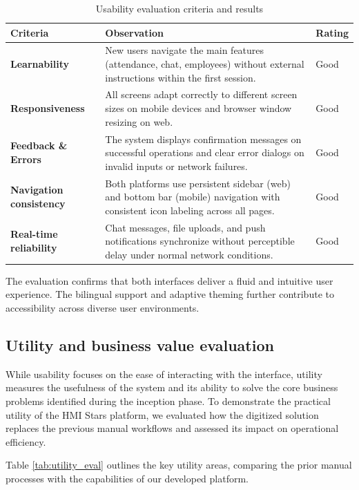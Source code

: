 \begin{table}[H]
\centering
\caption{Usability evaluation criteria and results}
\label{tab:usability_eval}
\begin{tabular}{|l|p{9cm}|l|}
\hline
\textbf{Criteria} & \textbf{Observation} & \textbf{Rating} \\
\hline
\textbf{Learnability} & New users navigate the main features (attendance, chat, employees) without external instructions within the first session. & Good \\
\hline
\textbf{Responsiveness} & All screens adapt correctly to different screen sizes on mobile devices and browser window resizing on web. & Good \\
\hline
\textbf{Feedback \& Errors} & The system displays confirmation messages on successful operations and clear error dialogs on invalid inputs or network failures. & Good \\
\hline
\textbf{Navigation consistency} & Both platforms use persistent sidebar (web) and bottom bar (mobile) navigation with consistent icon labeling across all pages. & Good \\
\hline
\textbf{Real-time reliability} & Chat messages, file uploads, and push notifications synchronize without perceptible delay under normal network conditions. & Good \\
\hline
\end{tabular}
\end{table}

The evaluation confirms that both interfaces deliver a fluid and intuitive user experience. The bilingual support and adaptive theming further contribute to accessibility across diverse user environments.

\subsection{Utility and business value evaluation}
While usability focuses on the ease of interacting with the interface, utility measures the usefulness of the system and its ability to solve the core business problems identified during the inception phase. To demonstrate the practical utility of the HMI Stars platform, we evaluated how the digitized solution replaces the previous manual workflows and assessed its impact on operational efficiency.

Table \ref{tab:utility_eval} outlines the key utility areas, comparing the prior manual processes with the capabilities of our developed platform.

